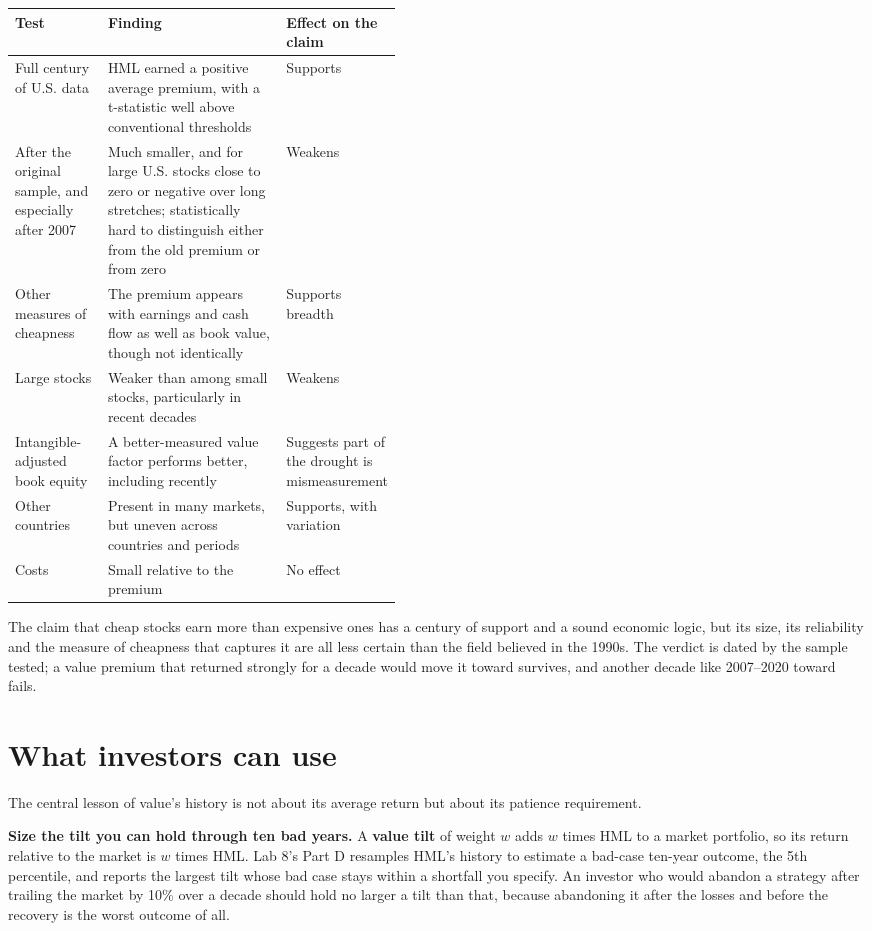 \begin{center}
\small
\begin{tabularx}{0.9\linewidth}{@{}>{\raggedright\arraybackslash}p{0.24\linewidth}>{\raggedright\arraybackslash}X>{\raggedright\arraybackslash}p{0.21\linewidth}@{}}
\toprule
Test & Finding & Effect on the claim \\
\midrule
Full century of U.S. data & HML earned a positive average premium, with a t-statistic well above conventional thresholds & Supports \\
After the original sample, and especially after 2007 & Much smaller, and for large U.S. stocks close to zero or negative over long stretches; statistically hard to distinguish either from the old premium or from zero & Weakens \\
Other measures of cheapness & The premium appears with earnings and cash flow as well as book value, though not identically & Supports breadth \\
Large stocks & Weaker than among small stocks, particularly in recent decades & Weakens \\
Intangible-adjusted book equity & A better-measured value factor performs better, including recently & Suggests part of the drought is mismeasurement \\
Other countries & Present in many markets, but uneven across countries and periods & Supports, with variation \\
Costs & Small relative to the premium & No effect \\
\bottomrule
\end{tabularx}
\end{center}

The claim that cheap stocks earn more than expensive ones has a century of support and a sound economic logic, but its size, its reliability and the measure of cheapness that captures it are all less certain than the field believed in the 1990s. The verdict is dated by the sample tested; a value premium that returned strongly for a decade would move it toward survives, and another decade like 2007--2020 toward fails.

\section{What investors can use}
\label{sec:08-investors}

The central lesson of value's history is not about its average return but about its patience requirement.

\textbf{Size the tilt you can hold through ten bad years.} A \textbf{value tilt} of weight $w$ adds $w$ times HML to a market portfolio, so its return relative to the market is $w$ times HML. Lab 8's Part D resamples HML's history to estimate a bad-case ten-year outcome, the 5th percentile, and reports the largest tilt whose bad case stays within a shortfall you specify. An investor who would abandon a strategy after trailing the market by 10\% over a decade should hold no larger a tilt than that, because abandoning it after the losses and before the recovery is the worst outcome of all.


